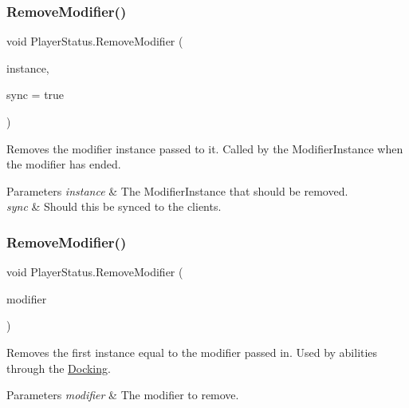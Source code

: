 \subsubsection{\texorpdfstring{Remove\+Modifier()}{RemoveModifier()}\hspace{0.1cm}{\footnotesize\ttfamily [1/2]}}
{\footnotesize\ttfamily void Player\+Status.\+Remove\+Modifier (\begin{DoxyParamCaption}\item[{\hyperlink{class_modifier_instance_server}{Modifier\+Instance\+Server}}]{instance,  }\item[{bool}]{sync = {\ttfamily true} }\end{DoxyParamCaption})}



Removes the modifier instance passed to it. Called by the Modifier\+Instance when the modifier has ended. 


\begin{DoxyParams}{Parameters}
{\em instance} & The Modifier\+Instance that should be removed.\\
\hline
{\em sync} & Should this be synced to the clients.\\
\hline
\end{DoxyParams}
\hypertarget{class_player_status_a04fbcb133455c0416c9fd7e7dbc974e2}{}\label{class_player_status_a04fbcb133455c0416c9fd7e7dbc974e2} 
\subsubsection{\texorpdfstring{Remove\+Modifier()}{RemoveModifier()}\hspace{0.1cm}{\footnotesize\ttfamily [2/2]}}
{\footnotesize\ttfamily void Player\+Status.\+Remove\+Modifier (\begin{DoxyParamCaption}\item[{\hyperlink{class_modifier}{Modifier}}]{modifier }\end{DoxyParamCaption})}



Removes the first instance equal to the modifier passed in. Used by abilities through the \hyperlink{class_docking}{Docking}. 


\begin{DoxyParams}{Parameters}
{\em modifier} & The modifier to remove.\\
\hline
\end{DoxyParams}


